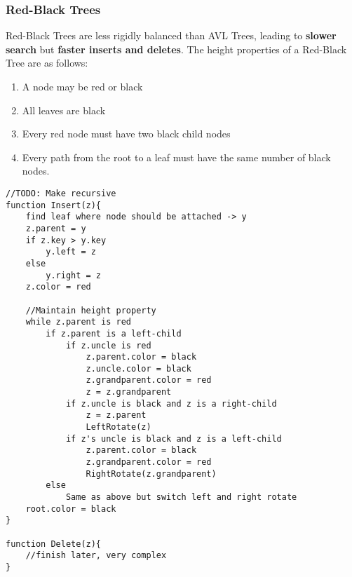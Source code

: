 \documentclass{article}
\begin{document}
\subsubsection{Red-Black Trees}
Red-Black Trees are less rigidly balanced than AVL Trees, leading to {\bf slower search} but {\bf faster inserts and deletes}. The height properties of a Red-Black Tree are as follows:
\begin{enumerate}
	\item A node may be red or black
	\item All leaves are black
	\item Every red node must have two black child nodes
	\item Every path from the root to a leaf must have the same number of black nodes.
\end{enumerate}

\begin{figure}[h]
\centering
{}
\end{figure}

\begin{minipage}{\linewidth}
\begin{lstlisting}[style=pseudo]
//TODO: Make recursive
function Insert(z){
	find leaf where node should be attached -> y
	z.parent = y
	if z.key > y.key
		y.left = z
	else
		y.right = z
	z.color = red

	//Maintain height property
	while z.parent is red
		if z.parent is a left-child
			if z.uncle is red
				z.parent.color = black
				z.uncle.color = black
				z.grandparent.color = red
				z = z.grandparent
			if z.uncle is black and z is a right-child
				z = z.parent
				LeftRotate(z)
			if z's uncle is black and z is a left-child
				z.parent.color = black
				z.grandparent.color = red
				RightRotate(z.grandparent)
		else
			Same as above but switch left and right rotate
	root.color = black
}

function Delete(z){
	//finish later, very complex
}
\end{lstlisting}
\end{minipage}
\end{document}
